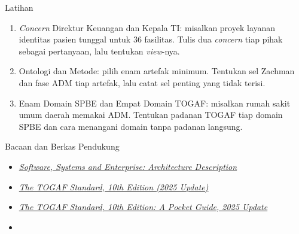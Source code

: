 \documentclass[aspectratio=169, table, 12pt]{beamer}
\begin{document}
\begin{frame}{{\Large Latihan}}
  \vspace{6pt}
  \small
  \begin{enumerate}
    \item \textit{Concern} Direktur Keuangan dan Kepala TI: misalkan proyek layanan identitas pasien
          tunggal untuk 36 fasilitas. Tulis dua \textit{concern} tiap pihak sebagai pertanyaan, lalu
          tentukan \textit{view}-nya.
    \item Ontologi dan Metode: pilih enam artefak minimum. Tentukan sel Zachman dan fase ADM tiap
          artefak, lalu catat sel penting yang tidak terisi.
    \item Enam Domain SPBE dan Empat Domain TOGAF: misalkan rumah sakit umum daerah memakai ADM. Tentukan
          padanan TOGAF tiap domain SPBE dan cara menangani domain tanpa padanan langsung.
  \end{enumerate}
\end{frame}

\begin{frame}{{\Large Bacaan dan Berkas Pendukung}}
  \vspace{10pt}
  \begin{itemize}
    \item \href{https://www.iso.org/standard/74393.html}{\textit{Software, Systems and Enterprise: Architecture Description}}
    \item \href{https://www.opengroup.org/togaf}{\textit{The TOGAF Standard, 10th Edition (2025 Update)}}
    \item \href{https://www.vanharen.net/store/the-togafr-standard-10th-edition-a-pocket-guide-2025-update}{\textit{The TOGAF Standard, 10th Edition: A Pocket Guide, 2025 Update}}
    \item {}
  \end{itemize}
\end{frame}
\end{document}
